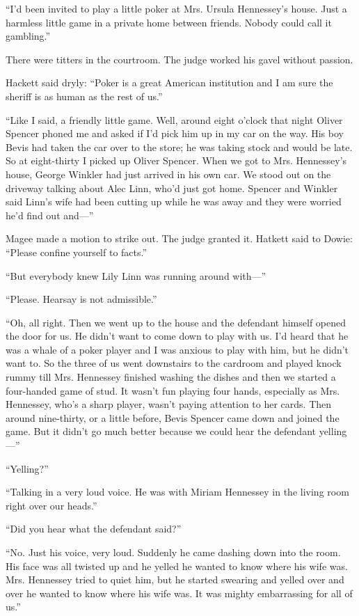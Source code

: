 \documentclass{novel}
\begin{document}
“I’d been invited to play a little poker at Mrs. Ursula Hennessey’s house. Just a harmless little game in a private home between friends. Nobody could call it gambling.”

There were titters in the courtroom. The judge worked his gavel without passion.

Hackett said dryly: “Poker is a great American institution and I am sure the sheriff is as human as the rest of us.”

“Like I said, a friendly little game. Well, around eight o’clock that night Oliver Spencer phoned me and asked if I’d pick him up in my car on the way. His boy Bevis had taken the car over to the store; he was taking stock and would be late. So at eight-thirty I picked up Oliver Spencer. When we got to Mrs. Hennessey’s house, George Winkler had just arrived in his own car. We stood out on the driveway talking about Alec Linn, who’d just got home. Spencer and Winkler said Linn’s wife had been cutting up while he was away and they were worried he’d find out and—”

Magee made a motion to strike out. The judge granted it. Hatkett said to Dowie: “Please confine yourself to facts.”

“But everybody knew Lily Linn was running around with—”

“Please. Hearsay is not admissible.”

“Oh, all right. Then we went up to the house and the defendant himself opened the door for us. He didn’t want to come down to play with us. I’d heard that he was a whale of a poker player and I was anxious to play with him, but he didn’t want to. So the three of us went downstairs to the cardroom and played knock rummy till Mrs. Hennessey finished washing the dishes and then we started a four-handed game of stud. It wasn’t fun playing four hands, especially as Mrs. Hennessey, who’s a sharp player, wasn’t paying attention to her cards. Then around nine-thirty, or a little before, Bevis Spencer came down and joined the game. But it didn’t go much better because we could hear the defendant yelling—”

“Yelling?”

“Talking in a very loud voice. He was with Miriam Hennessey in the living room right over our heads.”

“Did you hear what the defendant said?”

“No. Just his voice, very loud. Suddenly he came dashing down into the room. His face was all twisted up and he yelled he wanted to know where his wife was. Mrs. Hennessey tried to quiet him, but he started swearing and yelled over and over he wanted to know where his wife was. It was mighty embarrassing for all of us.”
\end{document}
